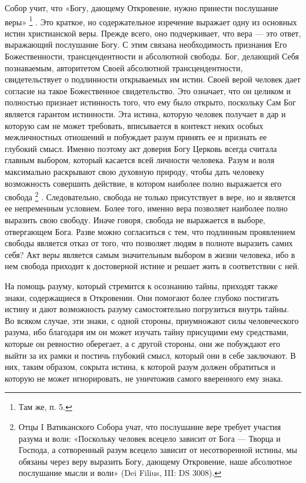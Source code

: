\documentclass[a5paper,10pt]{article}
\begin{document}
Собор учит, что «Богу, дающему Откровение, нужно принести послушание веры»
\footnote{Там же, п. 5.} .  Это краткое, но содержательное изречение выражает
одну из основных истин христианской веры. Прежде всего, оно подчеркивает, что
вера — это ответ, выражающий послушание Богу. С этим связана необходимость
признания Его Божественности, трансцендентности и абсолютной свободы. Бог,
делающий Себя познаваемым, авторитетом Своей абсолютной трансцендентности,
свидетельствует о подлинности открываемых им истин. Своей верой человек дает
согласие на такое Божественное свидетельство. Это означает, что он целиком и
полностью признает истинность того, что ему было открыто, поскольку Сам Бог
является гарантом истинности. Эта истина, которую человек получает в дар и
которую сам не может требовать, вписывается в контекст неких особых
межличностных отношений и побуждает разум принять ее и признать ее глубокий
смысл. Именно поэтому акт доверия Богу Церковь всегда считала главным выбором,
который касается всей личности человека. Разум и воля максимально раскрывают
свою духовную природу, чтобы дать человеку возможность совершить действие, в
котором наиболее полно выражается его свобода \footnote{Отцы I Ватиканского
Собора учат, что послушание вере требует участия разума и воли: «Поскольку
человек всецело зависит от Бога — Творца и Господа, а сотворенный разум всецело
зависит от несотворенной истины, мы обязаны через веру выразить Богу, дающему
Откровение, наше абсолютное послушание мысли и воли» (Dei Filius, III: DS
3008).} . Следовательно, свобода не только присутствует в вере, но и является
ее непременным условием. Более того, именно вера позволяет наиболее полно
выразить свою свободу. Иначе говоря, свобода не выражается в выборе,
отвергающем Бога. Разве можно согласиться с тем, что подлинным проявлением
свободы является отказ от того, что позволяет людям в полноте выразить самих
себя? Акт веры является самым значительным выбором в жизни человека, ибо в нем
свобода приходит к достоверной истине и решает жить в соответствии с ней.

На помощь разуму, который стремится к осознанию тайны, приходят также знаки,
содержащиеся в Откровении. Они помогают более глубоко постигать истину и дают
возможность разуму самостоятельно погрузиться внутрь тайны. Во всяком случае,
эти знаки, с одной стороны, приумножают силы человеческого разума, ибо
благодаря им он может изучать тайну присущими ему средствами, которые он
ревностно оберегает, а с другой стороны, они же побуждают его выйти за их рамки
и постичь глубокий смысл, который они в себе заключают. В них, таким образом,
сокрыта истина, к которой разум должен обратиться и которую не может
игнорировать, не уничтожив самого вверенного ему знака.
\end{document}
